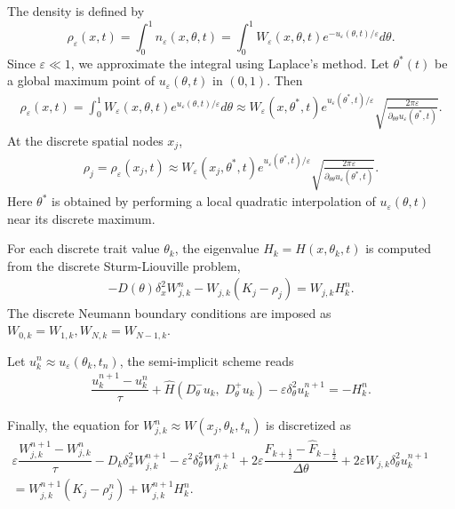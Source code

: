 \documentclass[11pt, dina4, amsfont12]{article}
\begin{document}
The density is defined by
$$\rho_\varepsilon(x, t) = \int_0^1 n_\varepsilon(x, \theta, t) = \int_0^1 W_\varepsilon(x,\theta,t)e^{-u_\varepsilon(\theta, t)/\varepsilon} d\theta.$$
Since $\varepsilon\ll 1$, we approximate the integral using Laplace's method. Let $\theta^*(t)$ be a global maximum point of $u_\varepsilon(\theta, t)$ in $(0, 1)$. Then 
\begin{align}
\rho_\varepsilon(x, t) = \int_0^1 W_\varepsilon(x, \theta, t) e^{u_\varepsilon(\theta, t)/\varepsilon} d\theta
\approx W_\varepsilon (x, \theta^*, t) e^{u_\varepsilon(\theta^*,t)/\varepsilon} \sqrt{\frac{2\pi\varepsilon}{\partial_{\theta\theta}u_\varepsilon(\theta^*, t)}}.   
\end{align}
At the discrete spatial nodes $x_j$,
\begin{align}
\rho_j =\rho_\varepsilon(x_j, t) 
\approx W_\varepsilon (x_j, \theta^*, t) e^{u_\varepsilon(\theta^*,t)/\varepsilon} \sqrt{\frac{2\pi\varepsilon}{\partial_{\theta\theta}u_\varepsilon(\theta^*, t)}}.   
\end{align}
Here $\theta^*$ is obtained by performing a local quadratic interpolation of
$u_\varepsilon(\theta,t)$ near its discrete maximum.

For each discrete trait value $\theta_k$, the eigenvalue $H_k = H(x, \theta_k, t)$ is computed from the discrete Sturm-Liouville problem,
\begin{align}
-D(\theta)\delta_x^2W_{j,k}^n-W_{j,k}(K_j - \rho_j)=W_{j,k}H_k^n.
\end{align}
The discrete Neumann boundary conditions are imposed as
$W_{0,k}=W_{1, k}, W_{N,k}=W_{N-1,k}$.

 Let $u_k^n\approx u_\varepsilon(\theta_k, t_n)$, the semi-implicit scheme reads
\begin{align}
\dfrac{u_k^{n+1} - u_k^n}{\tau} +\hat{H} \!\left(D_\theta^- u_k,\; D_\theta^+ u_k\right) - \varepsilon \delta_\theta^2 u_k^{n+1} = -H_k^n.
\end{align}

Finally, the equation for $W_{j,k}^n\approx W(x_j,\theta_k, t_n)$ is discretized as
\begin{equation}
\begin{aligned}
\varepsilon \dfrac{W_{j,k}^{n+1}-W_{j,k}^n}{\tau} - D_k\delta_x^2W_{j,k}^{n+1} - \varepsilon^2 \delta_\theta^2 W_{j,k}^{n+1} + 2\varepsilon \dfrac{\hat{F}_{k+\frac{1}{2}} - \hat{F}_{k-\frac{1}{2}}}{\Delta\theta} + 2\varepsilon W_{j,k}\delta_\theta^2u_k^{n+1} \qquad  \\
= W_{j,k}^{n+1}(K_j-\rho_j^n) + W_{j,k}^{n+1}H_k^n.
\end{aligned}  
\end{equation}
\end{document}
